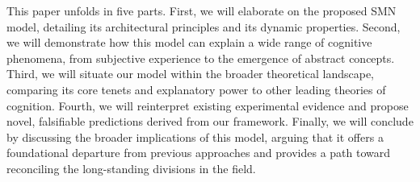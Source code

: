 This paper unfolds in five parts. First, we will elaborate on the proposed SMN model, detailing its architectural principles and its dynamic properties. Second, we will demonstrate how this model can explain a wide range of cognitive phenomena, from subjective experience to the emergence of abstract concepts. Third, we will situate our model within the broader theoretical landscape, comparing its core tenets and explanatory power to other leading theories of cognition. Fourth, we will reinterpret existing experimental evidence and propose novel, falsifiable predictions derived from our framework. Finally, we will conclude by discussing the broader implications of this model, arguing that it offers a foundational departure from previous approaches and provides a path toward reconciling the long-standing divisions in the field.